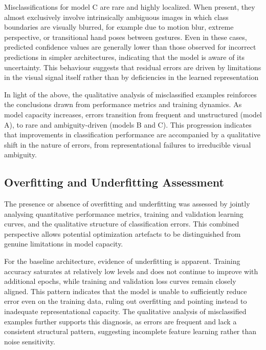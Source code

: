 \documentclass{article}
\begin{document}
Misclassifications for model C are rare and highly localized. When
present, they almost exclusively involve intrinsically ambiguous images
in which class boundaries are visually blurred, for example due to
motion blur, extreme perspective, or transitional hand poses between
gestures. Even in these cases, predicted confidence values are generally
lower than those observed for incorrect predictions in simpler
architectures, indicating that the model is aware of its uncertainty.
This behaviour suggests that residual errors are driven by limitations
in the visual signal itself rather than by deficiencies in the learned
representation

In light of the above, the qualitative analysis of misclassified
examples reinforces the conclusions drawn from performance metrics and
training dynamics. As model capacity increases, errors transition from
frequent and unstructured (model A), to rare and ambiguity-driven
(models B and C). This progression indicates that improvements in
classification performance are accompanied by a qualitative shift in the
nature of errors, from representational failures to irreducible visual
ambiguity.

\subsection{Overfitting and Underfitting Assessment}

The presence or absence of overfitting and underfitting was assessed by
jointly analysing quantitative performance metrics, training and
validation learning curves, and the qualitative structure of
classification errors. This combined perspective allows potential
optimization artefacts to be distinguished from genuine limitations in
model capacity.

For the baseline architecture, evidence of underfitting is apparent.
Training accuracy saturates at relatively low levels and does not
continue to improve with additional epochs, while training and
validation loss curves remain closely aligned. This pattern indicates
that the model is unable to sufficiently reduce error even on the
training data, ruling out overfitting and pointing instead to inadequate
representational capacity. The qualitative analysis of misclassified
examples further supports this diagnosis, as errors are frequent and
lack a consistent structural pattern, suggesting incomplete feature
learning rather than noise sensitivity.
\end{document}
